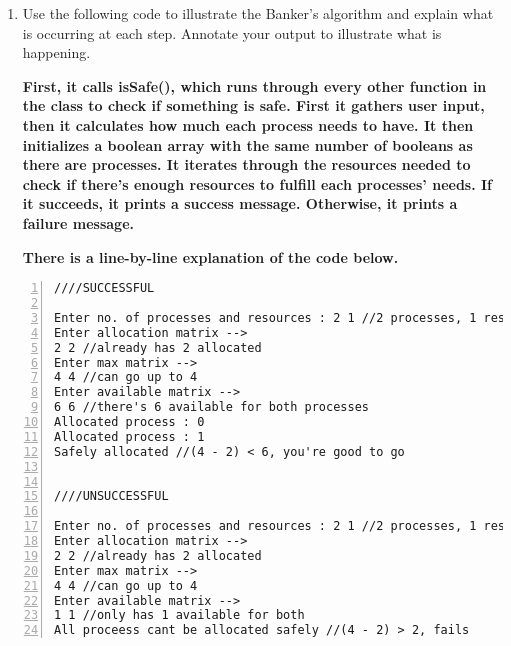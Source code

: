 \documentclass[11pt]{article}
\begin{document}
\begin{enumerate}

\item Use the following code to illustrate the Banker’s algorithm and explain what is occurring at each step. Annotate your output to illustrate what is happening.

\textbf{First, it calls isSafe(), which runs through every other function in the class to check if something is safe. First it gathers user input, then it calculates how much each process needs to have. It then initializes a boolean array with the same number of booleans as there are processes. It iterates through the resources needed to check if there's enough resources to fulfill each processes' needs. If it succeeds, it prints a success message. Otherwise, it prints a failure message.}

\textbf{There is a line-by-line explanation of the code below.}

\end{enumerate}

\begin{center}


\newpage

\begin{lstlisting}[basicstyle=\footnotesize \ttfamily,
       numbers=left,
       numbersep=5pt,
       numberstyle=\tiny,
       title=Output]
////SUCCESSFUL

Enter no. of processes and resources : 2 1 //2 processes, 1 resource
Enter allocation matrix -->
2 2 //already has 2 allocated
Enter max matrix -->
4 4 //can go up to 4
Enter available matrix -->
6 6 //there's 6 available for both processes
Allocated process : 0
Allocated process : 1
Safely allocated //(4 - 2) < 6, you're good to go


////UNSUCCESSFUL

Enter no. of processes and resources : 2 1 //2 processes, 1 resource
Enter allocation matrix -->
2 2 //already has 2 allocated
Enter max matrix -->
4 4 //can go up to 4
Enter available matrix -->
1 1 //only has 1 available for both
All proceess cant be allocated safely //(4 - 2) > 2, fails

\end{lstlisting}

\end{center}
\end{document}
